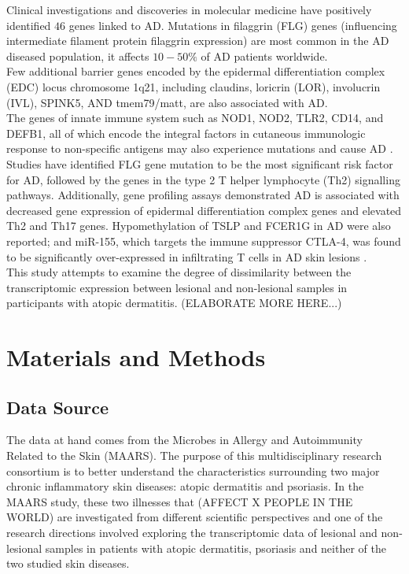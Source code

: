 \documentclass[journal, a4paper]{IEEEtran}
\begin{document}
Clinical investigations and discoveries in molecular medicine have positively identified $46$ genes linked to AD. Mutations in filaggrin (FLG) genes (influencing intermediate filament protein filaggrin expression) are most common in the AD diseased population, it affects $10-50\%$ of AD patients worldwide.\\

Few additional barrier genes encoded by the epidermal differentiation complex (EDC) locus chromosome 1q21, including claudins, loricrin (LOR), involucrin (IVL), SPINK5, AND tmem79/matt, are also associated with AD.\\

The genes of innate immune system such as NOD1, NOD2, TLR2, CD14, and DEFB1, all of which encode the integral factors in cutaneous immunologic response to non-specific antigens may also experience mutations and cause AD \cite{guttman2017atopic}. Studies have identified FLG gene mutation to be the most significant risk factor for AD, followed by the genes in the type 2 T helper lymphocyte (Th2) signalling pathways. Additionally, gene profiling assays demonstrated AD is associated with decreased gene expression of epidermal differentiation complex genes and elevated Th2 and Th17 genes. Hypomethylation of TSLP and FCER1G in AD were also reported; and miR-155, which targets the immune suppressor CTLA-4, was found to be significantly over-expressed in infiltrating T cells in AD skin lesions \cite{guttman2017atopic, bin2016genetic}.\\

This study attempts to examine the degree of dissimilarity between the transcriptomic expression between lesional and non-lesional samples in participants with atopic dermatitis. (ELABORATE MORE HERE...)

\section{Materials and Methods}

\subsection{Data Source}

The data at hand comes from the Microbes in Allergy and Autoimmunity Related to the Skin (MAARS). The purpose of this multidisciplinary research consortium is to better understand the characteristics surrounding two major chronic inflammatory skin diseases: atopic dermatitis and psoriasis\cite{MAARS}. In the MAARS study, these two illnesses that (AFFECT X PEOPLE IN THE WORLD) are investigated from different scientific perspectives and one of the research directions involved exploring the transcriptomic data of lesional and non-lesional samples in patients with atopic dermatitis, psoriasis and neither of the two studied skin diseases.
\end{document}
